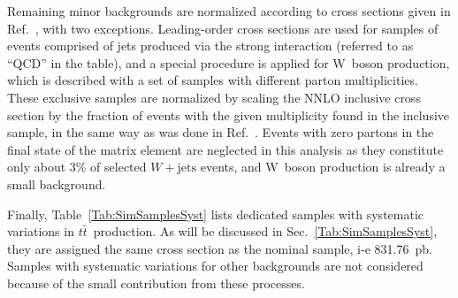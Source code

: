 Remaining minor backgrounds are normalized according to cross sections given in Ref.~\cite{Wiki:CrossSections}, with two exceptions.
Leading-order cross sections are used for samples of events comprised of jets produced via the strong interaction (referred to as ``QCD'' in the table), and a special procedure is applied for W~boson production, which is described with a set of samples with different parton multiplicities.
These exclusive samples are normalized by scaling the NNLO inclusive cross section by the fraction of events with the given multiplicity found in the inclusive sample, in the same way as was done in Ref.~\cite{CMS-AN-13-113}.
Events with zero partons in the final state of the matrix element are neglected in this analysis as they constitute only about 3\% of selected $W + \text{jets}$ events, and W~boson production is already a small background.

Finally, Table~\ref{Tab:SimSamplesSyst} lists dedicated samples with systematic variations in $t\bar t$~production.
As will be discussed in Sec.~\ref{Tab:SimSamplesSyst}, they are assigned the same cross section as the nominal sample, i-e 831.76~pb.
Samples with systematic variations for other backgrounds are not considered because of the small contribution from these processes.

